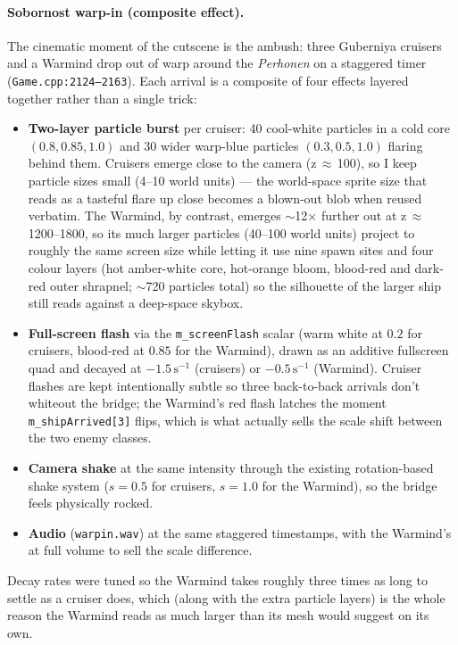 \documentclass[11pt,a4paper]{article}
\begin{document}
\paragraph{Sobornost warp-in (composite effect).}
The cinematic moment of the cutscene is the ambush: three Guberniya
cruisers and a Warmind drop out of warp around the \emph{Perhonen} on a
staggered timer (\texttt{Game.cpp:2124--2163}). Each arrival is a
composite of four effects layered together rather than a single trick:
\begin{itemize}
  \item \textbf{Two-layer particle burst} per cruiser: 40 cool-white
        particles in a cold core
        $(0.8, 0.85, 1.0)$ and 30 wider warp-blue particles
        $(0.3, 0.5, 1.0)$ flaring behind them. Cruisers emerge close to
        the camera (z\,$\approx$\,100), so I keep particle sizes small
        (4--10 world units) — the world-space sprite size that reads as
        a tasteful flare up close becomes a blown-out blob when reused
        verbatim. The Warmind, by contrast, emerges $\sim$12$\times$
        further out at z\,$\approx$\,1200--1800, so its much larger
        particles (40--100 world units) project to roughly the same
        screen size while letting it use nine spawn sites and four colour
        layers (hot amber-white core, hot-orange bloom, blood-red and
        dark-red outer shrapnel; $\sim$720 particles total) so the
        silhouette of the larger ship still reads against a deep-space
        skybox.
  \item \textbf{Full-screen flash} via the \texttt{m\_screenFlash}
        scalar (warm white at $0.2$ for cruisers, blood-red at $0.85$
        for the Warmind), drawn as an additive fullscreen quad and
        decayed at $-1.5\,\mathrm{s}^{-1}$ (cruisers) or
        $-0.5\,\mathrm{s}^{-1}$ (Warmind). Cruiser flashes are kept
        intentionally subtle so three back-to-back arrivals don't
        whiteout the bridge; the Warmind's red flash latches the
        moment \texttt{m\_shipArrived[3]} flips, which is what
        actually sells the scale shift between the two enemy classes.
  \item \textbf{Camera shake} at the same intensity through the existing
        rotation-based shake system ($s = 0.5$ for cruisers, $s = 1.0$
        for the Warmind), so the bridge feels physically rocked.
  \item \textbf{Audio} (\texttt{warpin.wav}) at the same staggered
        timestamps, with the Warmind's at full volume to sell the scale
        difference.
\end{itemize}
Decay rates were tuned so the Warmind takes roughly three times as long
to settle as a cruiser does, which (along with the extra particle layers)
is the whole reason the Warmind reads as much larger than its mesh
would suggest on its own.
\end{document}
